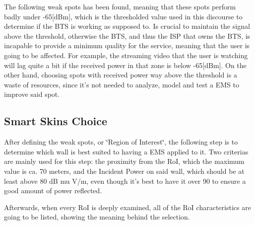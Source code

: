 The following weak spots has been found, meaning that these spots
perform badly under -65{[}dBm{]}, which is the thresholded value used
in this discourse to determine if the BTS is working as supposed to.
Is crucial to maintain the signal above the threshold, otherwise the
BTS, and thus the ISP that owns the BTS, is incapable to provide a
minimum quality for the service, meaning that the user is going to
be affected. For example, the streaming video that the user is watching
will lag quite a bit if the received power in that zone is below -65{[}dBm{]}.
On the other hand, choosing spots with received power way above the
threshold is a waste of resources, since it's not needed to analyze,
model and test a EMS to improve said spot.


\subsection{Smart Skins Choice}

After defining the weak spots, or \char`\"{}Region of Interest\char`\"{},
the following step is to determine which wall is best suited to having
a EMS applied to it. Two criterias are mainly used for this step:
the proximity from the RoI, which the maximum value is ca. 70 meters,
and the Incident Power on said wall, which should be at least above
80 dB mu V/m, even though it's best to have it over 90 to ensure a
good amount of power reflected. 

Afterwards, when every RoI is deeply examined, all of the RoI characteristics
are going to be listed, showing the meaning behind the selection. 


